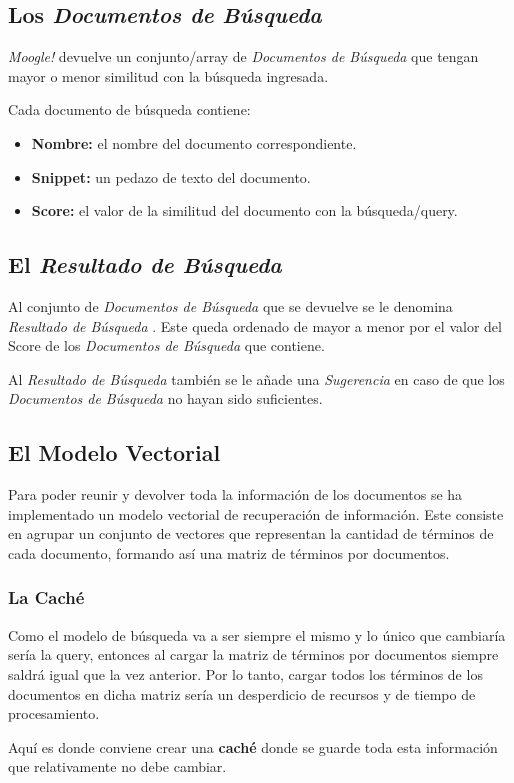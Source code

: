 \documentclass[12pt]{article}
\newcommand{\Moogle}{\emph{Moogle!} }
\newcommand{\SearchItems}{\emph{Documentos de Búsqueda} }
\newcommand{\SearchResult}{\emph{Resultado de Búsqueda} }
\begin{document}
\subsection*{Los \SearchItems}
	\Moogle devuelve un conjunto/array de \SearchItems que tengan mayor o menor similitud con la búsqueda ingresada.
	
	Cada documento de búsqueda contiene:
\begin{itemize}
	\item \textbf{Nombre:} el nombre del documento correspondiente.
	\item \textbf{Snippet:} un pedazo de texto del documento.
	\item \textbf{Score:} el valor de la similitud del documento con la búsqueda/query.
\end{itemize}	
	  
\subsection*{El \SearchResult}
	  Al conjunto de \SearchItems que se devuelve se le denomina \SearchResult .
	  Este queda ordenado de mayor a menor por el valor del Score de los \SearchItems que contiene.
	  
	  Al \SearchResult también se le añade una \emph{Sugerencia} en caso de que los \SearchItems no hayan sido suficientes.
	  
\subsection*{El Modelo Vectorial}
	Para poder reunir y devolver toda la información de los documentos se ha implementado un modelo vectorial de recuperación de información.
	Este consiste en agrupar un conjunto de vectores que representan la cantidad de términos de cada documento, formando así una matriz de términos por documentos.
	
\subsubsection*{La Caché}
	Como el modelo de búsqueda va a ser siempre el mismo y lo único que cambiaría sería la query, entonces al cargar la matriz de términos por documentos siempre saldrá igual que la vez anterior.
	Por lo tanto, cargar todos los términos de los documentos en dicha matriz sería un desperdicio de recursos y de tiempo de procesamiento.
	
	Aquí es donde conviene crear una \textbf{caché} donde se guarde toda esta información que relativamente no debe cambiar.
	
\end{document}
